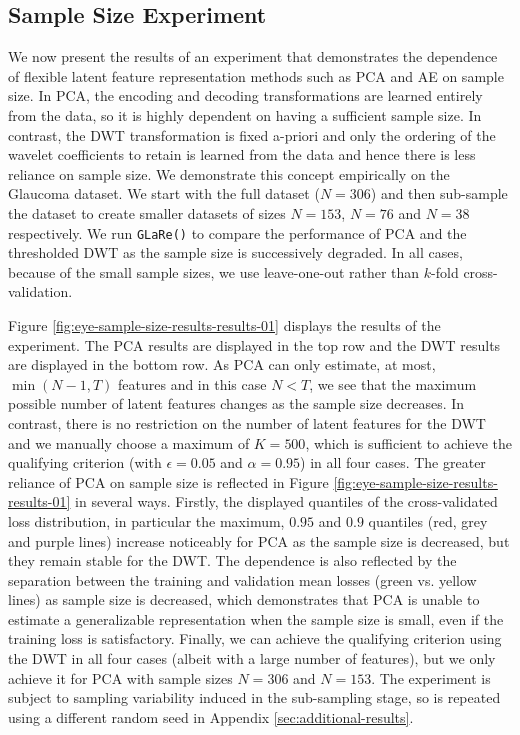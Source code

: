 \subsection{Sample Size Experiment}\label{sec:sample-size-experiment}

We now present the results of an experiment that demonstrates the dependence of flexible latent feature representation methods such as PCA and AE on sample size.
In PCA, the encoding and decoding transformations are learned entirely from the data, so it is highly dependent on having a sufficient sample size.
In contrast, the DWT transformation is fixed a-priori and only the ordering of the wavelet coefficients to retain is learned from the data and hence there is less reliance on sample size.
We demonstrate this concept empirically on the Glaucoma dataset. 
We start with the full dataset ($N=306$) and then sub-sample the dataset to create smaller datasets of sizes $N=153$, $N=76$ and $N=38$ respectively.
We run \texttt{GLaRe()} to compare the performance of PCA and the thresholded DWT as the sample size is successively degraded.
In all cases, because of the small sample sizes, we use leave-one-out rather than $k$-fold cross-validation.

Figure \ref{fig:eye-sample-size-results-results-01} displays the results of the experiment.
The PCA results are displayed in the top row and the DWT results are displayed in the bottom row.
As PCA can only estimate, at most, $\min(N-1, T)$ features and in this case $N<T$, we see that the maximum possible number of latent features changes as the sample size decreases.
In contrast, there is no restriction on the number of latent features for the DWT and we manually choose a maximum of $K=500$, which is sufficient to achieve the qualifying criterion (with $\epsilon=0.05$ and $\alpha=0.95$) in all four cases.
The greater reliance of PCA on sample size is reflected in Figure \ref{fig:eye-sample-size-results-results-01} in several ways.
Firstly, the displayed quantiles of the cross-validated loss distribution, in particular the maximum, $0.95$ and $0.9$ quantiles (red, grey and purple lines) increase noticeably for PCA as the sample size is decreased, but they remain stable for the DWT.
The dependence is also reflected by the separation between the training and validation mean losses (green vs. yellow lines) as sample size is decreased, which demonstrates that PCA is unable to estimate a generalizable representation when the sample size is small, even if the training loss is satisfactory.
Finally, we can achieve the qualifying criterion using the DWT in all four cases (albeit with a large number of features), but we only achieve it for PCA with sample sizes $N=306$ and $N=153$.
The experiment is subject to sampling variability induced in the sub-sampling stage, so is repeated using a different random seed in Appendix \ref{sec:additional-results}.


